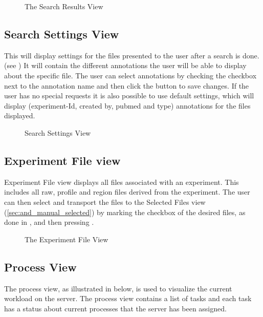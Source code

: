 \begin{figure}[h]
\caption{The Search Results View}
\label{fig:and_search_results_man} 
\end{figure}
\FloatBarrier


\subsection{Search Settings View}
This will display settings for the files presented to the user after a search is done.(see ) It will contain the different annotations the user will be able to display about the specific file. The user can select annotations by checking the checkbox next to the annotation name and then click the button to save changes. If the user has no special requests it is also possible to use default settings, which will display (experiment-Id, created by, pubmed and type) annotations for the files displayed. 

\begin{figure}[ht]
\caption{Search Settings View}
\label{fig:and_search_settings}
\end{figure}
\FloatBarrier


\subsection{Experiment File view}
Experiment File view displays all files associated with an experiment. This includes all raw, profile and region files derived from the experiment. The user can then select and transport the files to the Selected Files view (\ref{sec:and_manual_selected}) by marking the checkbox of the desired files, as done in  , and then pressing .

\begin{figure}[h]
\caption{ The Experiment File View}
\label{fig:and_experiment_man}
\end{figure}
\FloatBarrier


\subsection{Process View}
The process view, as illustrated in  below, is used to visualize the current workload on the server. The process view contains a list of tasks and each task has a status about current processes that the server has been assigned.

